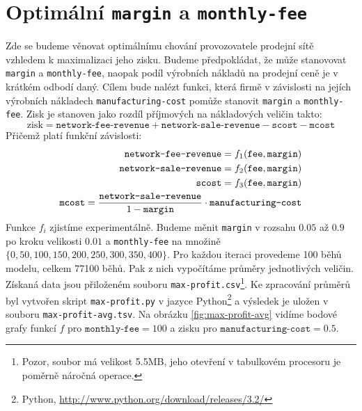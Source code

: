 \documentclass[a4wide,12pt]{report}
\begin{document}
\section{Optimální \texttt{margin} a \texttt{monthly-fee}}
Zde se budeme věnovat optimálnímu chování provozovatele prodejní sítě vzhledem k maximalizaci jeho zisku. Budeme předpokládat, že může stanovovat \texttt{margin} a \texttt{monthly-fee}, naopak podíl výrobních nákladů na prodejní ceně je v krátkém odbodí daný. Cílem bude nalézt funkci, která firmě v závislosti na jejích výrobních nákladech \texttt{manufacturing-cost} pomůže stanovit \texttt{margin} a \texttt{monthly-fee}. Zisk je stanoven jako rozdíl příjmových na nákladových veličin takto:
\[ \text{zisk}=\texttt{network-fee-revenue}+\texttt{network-sale-revenue}-\texttt{scost}-\texttt{mcost} \]
Přičemž platí funkční závislosti:
\begin{align}
\texttt{network-fee-revenue}=f_1(\texttt{fee},\texttt{margin})\notag\\
\texttt{network-sale-revenue}=f_2(\texttt{fee},\texttt{margin})\notag\\
\texttt{scost}=f_3(\texttt{fee},\texttt{margin})\notag\\
\texttt{mcost}=\frac{\texttt{network-sale-revenue}}{1-\texttt{margin}}\cdot\texttt{manufacturing-cost}\notag
\end{align}
Funkce $f_i$ zjistíme experimentálně. Budeme měnit \texttt{margin} v rozsahu $0.05$ až $0.9$ po kroku velikosti $0.01$ a \texttt{monthly-fee} na množině $\{0,50,100,150,200,250,300,350,400\}$. Pro každou iteraci provedeme 100 běhů modelu, celkem 77100 běhů. Pak z nich vypočítáme průměry jednotlivých veličin. Získaná data jsou přiloženém souboru \texttt{max-profit.csv}\footnote{Pozor, soubor má velikost 5.5MB, jeho otevření v tabulkovém procesoru je poměrně náročná operace.}. Ke zpracování průměrů byl vytvořen skript \texttt{max-profit.py} v jazyce Python\footnote{Python, \url{http://www.python.org/download/releases/3.2/}} a výsledek je uložen v souboru \texttt{max-profit-avg.tsv}. Na obrázku \ref{fig:max-profit-avg} vidíme bodové grafy funkcí $f$ pro $\texttt{monthly-fee}=100$ a zisku pro $\texttt{manufacturing-cost}=0.5$. 
\end{document}
